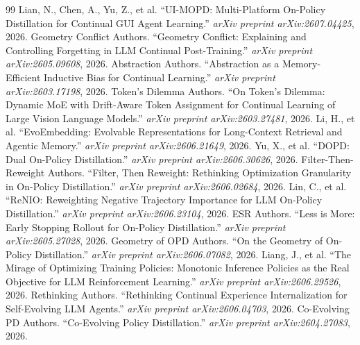 \documentclass[11pt,a4paper]{article}
\begin{document}
\begin{thebibliography}{99}
 Lian, N., Chen, A., Yu, Z., et al. ``UI-MOPD: Multi-Platform On-Policy Distillation for Continual GUI Agent Learning.'' \emph{arXiv preprint arXiv:2607.04425}, 2026.
 Geometry Conflict Authors. ``Geometry Conflict: Explaining and Controlling Forgetting in LLM Continual Post-Training.'' \emph{arXiv preprint arXiv:2605.09608}, 2026.
 Abstraction Authors. ``Abstraction as a Memory-Efficient Inductive Bias for Continual Learning.'' \emph{arXiv preprint arXiv:2603.17198}, 2026.
 Token's Dilemma Authors. ``On Token's Dilemma: Dynamic MoE with Drift-Aware Token Assignment for Continual Learning of Large Vision Language Models.'' \emph{arXiv preprint arXiv:2603.27481}, 2026.
 Li, H., et al. ``EvoEmbedding: Evolvable Representations for Long-Context Retrieval and Agentic Memory.'' \emph{arXiv preprint arXiv:2606.21649}, 2026.
 Yu, X., et al. ``DOPD: Dual On-Policy Distillation.'' \emph{arXiv preprint arXiv:2606.30626}, 2026.
 Filter-Then-Reweight Authors. ``Filter, Then Reweight: Rethinking Optimization Granularity in On-Policy Distillation.'' \emph{arXiv preprint arXiv:2606.02684}, 2026.
 Lin, C., et al. ``ReNIO: Reweighting Negative Trajectory Importance for LLM On-Policy Distillation.'' \emph{arXiv preprint arXiv:2606.23104}, 2026.
 ESR Authors. ``Less is More: Early Stopping Rollout for On-Policy Distillation.'' \emph{arXiv preprint arXiv:2605.27028}, 2026.
 Geometry of OPD Authors. ``On the Geometry of On-Policy Distillation.'' \emph{arXiv preprint arXiv:2606.07082}, 2026.
 Liang, J., et al. ``The Mirage of Optimizing Training Policies: Monotonic Inference Policies as the Real Objective for LLM Reinforcement Learning.'' \emph{arXiv preprint arXiv:2606.29526}, 2026.
 Rethinking Authors. ``Rethinking Continual Experience Internalization for Self-Evolving LLM Agents.'' \emph{arXiv preprint arXiv:2606.04703}, 2026.
 Co-Evolving PD Authors. ``Co-Evolving Policy Distillation.'' \emph{arXiv preprint arXiv:2604.27083}, 2026.
\end{thebibliography}
\end{document}
